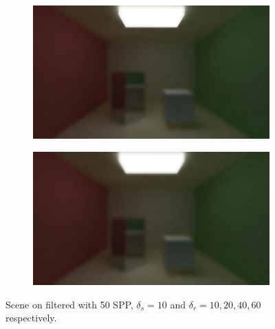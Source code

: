 \documentclass[titlepage,12pt]{report}
\begin{document}
\begin{figure}[H]
	\begin{subfigure}{.48\textwidth}
		\centering
		\includegraphics[scale=0.2]{media/bilateral/cornell_normal_50_bilateral_filter_21_10_40.png}
		\label{bilateral_filter_19}
	\end{subfigure}
	\begin{subfigure}{.48\textwidth}
		\centering
		\includegraphics[scale=0.2]{media/bilateral/cornell_normal_50_bilateral_filter_21_10_60.png}
		\label{bilateral_filter_20}
	\end{subfigure}
	\caption{Scene on filtered with 50 SPP, $\delta_s = 10$ and $\delta_r = 10, 20, 40, 60$ respectively.}
	\label{bilateral_filter_05}
\end{figure}
\end{document}
